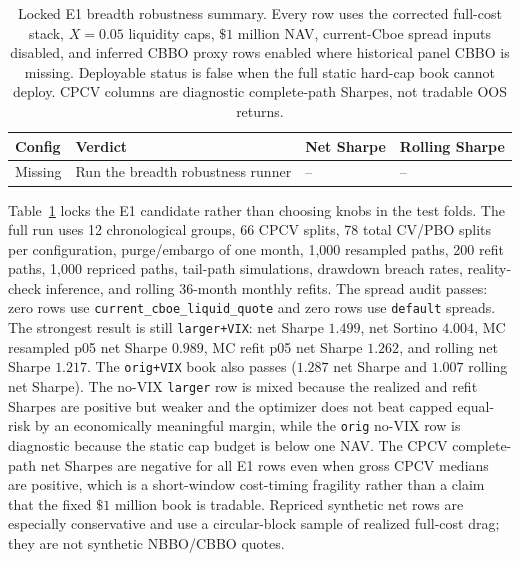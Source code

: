 \begin{table}[H]
\centering
\scriptsize
{}
  {\resizebox{\textwidth}{!}{}}
  {\begin{tabular}{llll}\toprule Config & Verdict & Net Sharpe & Rolling Sharpe \\\midrule
  Missing & Run the breadth robustness runner & -- & -- \\\bottomrule\end{tabular}}
\caption{Locked E1 breadth robustness summary. Every row uses the corrected full-cost
stack, \(X=0.05\) liquidity caps, \(\$1\) million NAV, current-Cboe spread inputs disabled,
and inferred CBBO proxy rows enabled where historical panel CBBO is missing. Deployable
status is false when the full static hard-cap book cannot deploy. CPCV columns are
diagnostic complete-path Sharpes, not tradable OOS returns.}
\label{tab:breadth_robustness_summary}
\end{table}

Table~\ref{tab:breadth_robustness_summary} locks the E1 candidate rather than choosing
knobs in the test folds. The full run uses 12 chronological groups, 66 CPCV splits, 78
total CV/PBO splits per configuration, purge/embargo of one month, 1,000 resampled paths,
200 refit paths, 1,000 repriced paths, tail-path simulations, drawdown breach rates,
reality-check inference, and rolling 36-month monthly refits. The spread audit passes:
zero rows use \texttt{current\_cboe\_liquid\_quote} and zero rows use \texttt{default}
spreads. The strongest result is still \texttt{larger+VIX}: net Sharpe \(1.499\), net
Sortino \(4.004\), MC resampled p05 net Sharpe \(0.989\), MC refit p05 net Sharpe
\(1.262\), and rolling net Sharpe \(1.217\). The \texttt{orig+VIX} book also passes
(\(1.287\) net Sharpe and \(1.007\) rolling net Sharpe). The no-VIX \texttt{larger} row
is mixed because the realized and refit Sharpes are positive but weaker and the optimizer
does not beat capped equal-risk by an economically meaningful margin, while the
\texttt{orig} no-VIX row is diagnostic because the static cap budget is below one NAV.
The CPCV complete-path net Sharpes are negative for all E1 rows even when gross CPCV
medians are positive, which is a short-window cost-timing fragility rather than a
claim that the fixed \(\$1\) million book is tradable. Repriced synthetic net rows are
especially conservative and use a circular-block sample of realized full-cost drag; they
are not synthetic NBBO/CBBO quotes.

